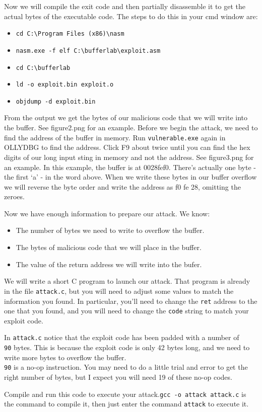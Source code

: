 \documentclass{article}
\begin{document}
Now we will compile the exit code and then partially disassemble it to get the actual bytes of the executable code.  The steps to do this in your cmd window are:

\begin{itemize}
	\item \texttt{cd C:\textbackslash{}Program Files (x86)\textbackslash{}nasm}
	\item \texttt{nasm.exe  -f elf C:\textbackslash{}bufferlab\textbackslash{}exploit.asm}
	\item \texttt{cd C:\textbackslash{}bufferlab}
	\item \texttt{ld -o exploit.bin exploit.o}
	\item \texttt{objdump -d exploit.bin}
\end{itemize}

From the output we get the bytes of our malicious code that we will write into the buffer.  See figure2.png for an example. Before we begin the attack, we need to find the address of the buffer in memory.  Run \texttt{vulnerable.exe} again in OLLYDBG to find the address. Click F9 about twice until you can find the hex digits of our long input sting in memory and not the address.  See figure3.png for an example.  In this example, the buffer is at
0028fef0.  There's actually one byte - the first `a' - in the word above. When we write these bytes in our buffer overflow we will reverse the byte order and write the address as f0 fe 28, omitting the zeroes.

Now we have enough information to prepare our attack. We know:
\begin{itemize}
	\item The number of bytes we need to write to overflow the buffer.
	\item The bytes of malicious code that we will place in the buffer.
	\item The value of the return address we will write into the bufer.
\end{itemize}

We will write a short C program to launch our attack.  That program is already in the file \texttt{attack.c}, but you will need to adjust some values to match the information you found. In particular, you'll need to change the \texttt{ret} address to the one that you found, and you will need to change the \texttt{code} string to match your exploit code.

In \texttt{attack.c} notice that the exploit code has been padded with a number of \texttt{\\90} bytes. This is because the exploit code is only 42 bytes long, and we need to write more bytes to overflow the buffer.  \texttt{\\90} is a no-op instruction. You may need to do a little trial and error to get the right number of bytes, but I expect you will need 19 of these no-op codes.

Compile and run this code to execute your attack.\texttt{gcc -o attack attack.c} is the command to compile it, then just enter the command \texttt{attack} to execute it.
\end{document}
